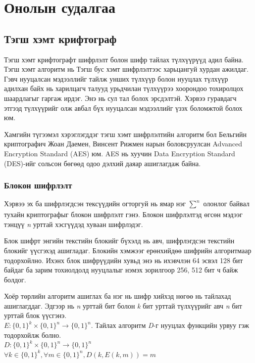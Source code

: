 \chapter{Онолын судалгаа}
\section{Тэгш хэмт крифтограф}
Тэгш хэмт крифтографт шифрлэлт болон шифр тайлах түлхүүрүүд адил байна. Тэгш хэмт алгоритм нь Тэгш бус хэмт шифрлэлтээс харьцангуй хурдан ажилдаг. Гэвч нууцалсан мэдээллийг тайлж унших түлхүүр болон нууцлах түлхүүр адилхан байх нь харилцагч талууд урьдчилан түлхүүрээ хоорондоо тохиролцох шаардлагыг гаргаж ирдэг. Энэ нь сул тал болох эрсдэлтэй. Хэрвээ гуравдагч этгээд түлхүүрийг олж авбал бүх нууцалсан мэдээллийг үзэх боломжтой болох юм.

Хамгийн түгээмэл хэрэглэгддэг тэгш хэмт шифрлэлтийн алгоритм бол Бельгийн криптографич Жоан Даемен, Винсент Рижмен нарын боловсруулсан Advanced Encryption Standard (AES) юм. AES нь хуучин Data Encryption Standard (DES)-ийг сольсон бөгөөд одоо дэлхий даяар ашиглагдаж байна.\cite{AES}
\subsection{Блокон шифрлэлт}

Хэрвээ эх ба шифрлэгдсэн тексүүдийн огторгуй нь ямар нэг $\sum_{}^{n}$ олонлог байвал тухайн криптографыг блокон шифрлэлт гэнэ. Блокон шифрлэлтэд өгсөн мэдээг тэнцүү \textit{n} урттай хэсгүүдэд хуваан шифрлэдэг.\cite{intro_crypo}

Блок шифрт энгийн текстийн блокийг бүхэлд нь авч, шифрлэгдсэн текстийн блокийг үүсгэхэд ашигладаг. Блокийн хэмжээг ерөнхийдөө шифрийн алгоритмаар тодорхойлно. Ихэнх блок шифрүүдийн хувьд энэ нь ихэвчлэн 64 эсвэл 128 бит байдаг ба зарим тохиолдолд нууцлалыг нэмэх зорилгоор 256, 512 бит ч байж болдог.


Хоёр төрлийн алгоритм ашиглах ба нэг нь шифр хийхэд нөгөө нь тайлахад ашиглагддаг. Эдгээр нь \textit{n} урттай бит болон \textit{k} бит урттай түлхүүрийг авч \textit{n} бит урттай блок үүсгэнэ.\\$E: \{0,1\}^k \times \{0,1\}^n \rightarrow \{0,1\}^n$.
Тайлах алгоритм \textit{D}-г нууцлах функцийн урвуу гэж тодорхойлж болно.\\ $D: \{0,1\}^k \times \{0,1\}^n \rightarrow \{0,1\}^n$\\
$\forall k \in \{0,1\}^k, \forall m \in \{0,1\}^n, D(k, E(k, m)) = m$\\
\cite{modern_crypto}

